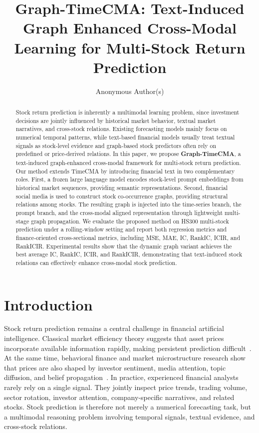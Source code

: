 \documentclass[runningheads]{llncs}
\title{Graph-TimeCMA: Text-Induced Graph Enhanced Cross-Modal Learning for Multi-Stock Return Prediction}
\author{Anonymous Author(s)}
\institute{Anonymous Institution\\
\email{anonymous@example.com}}
\begin{document}
\maketitle

\begin{abstract}
Stock return prediction is inherently a multimodal learning problem, since investment decisions are jointly influenced by historical market behavior, textual market narratives, and cross-stock relations. Existing forecasting models mainly focus on numerical temporal patterns, while text-based financial models usually treat textual signals as stock-level evidence and graph-based stock predictors often rely on predefined or price-derived relations. In this paper, we propose \textbf{Graph-TimeCMA}, a text-induced graph-enhanced cross-modal framework for multi-stock return prediction. Our method extends TimeCMA by introducing financial text in two complementary roles. First, a frozen large language model encodes stock-level prompt embeddings from historical market sequences, providing semantic representations. Second, financial social media is used to construct stock co-occurrence graphs, providing structural relations among stocks. The resulting graph is injected into the time-series branch, the prompt branch, and the cross-modal aligned representation through lightweight multi-stage graph propagation. We evaluate the proposed method on HS300 multi-stock prediction under a rolling-window setting and report both regression metrics and finance-oriented cross-sectional metrics, including MSE, MAE, IC, RankIC, ICIR, and RankICIR. Experimental results show that the dynamic graph variant achieves the best average IC, RankIC, ICIR, and RankICIR, demonstrating that text-induced stock relations can effectively enhance cross-modal stock prediction.

\end{abstract}

\section{Introduction}

Stock return prediction remains a central challenge in financial artificial intelligence. Classical market efficiency theory suggests that asset prices incorporate available information rapidly, making persistent prediction difficult~\cite{fama1970efficient}. At the same time, behavioral finance and market microstructure research show that prices are also shaped by investor sentiment, media attention, topic diffusion, and belief propagation~\cite{baker2006investor,barber2008all,tetlock2007giving,da2011attention}. In practice, experienced financial analysts rarely rely on a single signal. They jointly inspect price trends, trading volume, sector rotation, investor attention, company-specific narratives, and related stocks. Stock prediction is therefore not merely a numerical forecasting task, but a multimodal reasoning problem involving temporal signals, textual evidence, and cross-stock relations.
\end{document}
